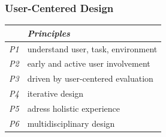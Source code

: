 \documentclass{kul-ulille-beamer}
\begin{document}
\begin{frame}[c, noframenumbering]
\frametitle{User-Centered Design}

  \begin{minipage}[c]{.5\textwidth}
  \begin{tabular}{|l|l|}
    \hline
     & \emph{Principles} \\ \hline
     \emph{P1} & understand user, task, environment \\
     \emph{P2} & early and active user involvement \\
     \emph{P3} & driven by user-centered evaluation \\
     \emph{P4} & iterative design \\
     \emph{P5} & adress holistic experience \\
     \emph{P6} & multidisciplinary design \\
    \hline
  \end{tabular}
  \end{minipage}\hfill%
  \begin{minipage}[c]{.4\textwidth}
  \end{minipage}

\end{frame}
\end{document}
